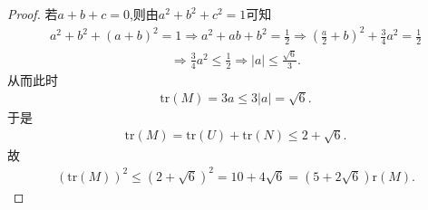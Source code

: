 \documentclass[../../main.tex]{subfiles}
\begin{document}
\begin{proof}
若$a+b+c=0$,则由$a^2+b^2+c^2=1$可知
\begin{align*}
a^2+b^2+(a+b)^2=1\Rightarrow a^2+ab+b^2=\frac{1}{2}\Rightarrow \left( \frac{a}{2}+b \right) ^2+\frac{3}{4}a^2=\frac{1}{2}
\end{align*}
\begin{align*}
\Rightarrow \frac{3}{4}a^2\leqslant \frac{1}{2}\Rightarrow |a|\leqslant \frac{\sqrt{6}}{3}.
\end{align*}
从而此时
\begin{align*}
\mathrm{tr}(M) =3a\leqslant 3|a|=\sqrt{6}.
\end{align*}
于是
\begin{align*}
\mathrm{tr}(M) =\mathrm{tr}(U) +\mathrm{tr}(N) \leqslant 2+\sqrt{6}.
\end{align*}
故
\begin{align*}
(\mathrm{tr}(M))^2\leqslant \left( 2+\sqrt{6} \right) ^2=10+4\sqrt{6}=\left( 5+2\sqrt{6} \right) \mathrm{r}(M).
\end{align*}

\end{proof}
\end{document}

